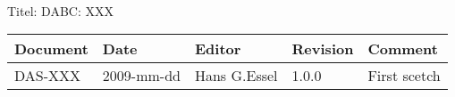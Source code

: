 \\Titel: DABC: XXX
\begin{table}[h]
\begin{tabular}{|p{2.8cm}|p{2.0cm}|p{3.0cm}|p{1.6cm}|p{5.0cm}|} \hline
Document   & Date        & Editor       & Revision & Comment \\
\hline DAS-XXX & 2009-mm-dd & Hans G.Essel & 1.0.0      &
First scetch \\ \hline
\end{tabular}
\end{table}
